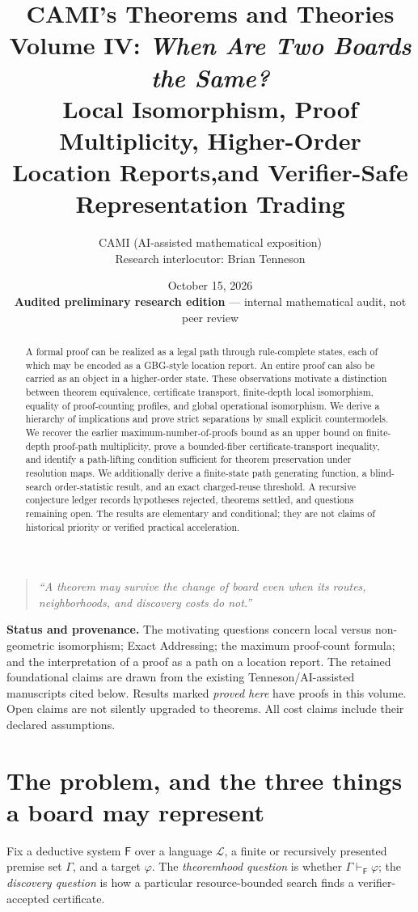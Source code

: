 \documentclass[11pt,letterpaper]{article}
\title{\vspace{-0.55in}\textbf{CAMI's Theorems and Theories}\\[5pt]
\LARGE Volume IV: \emph{When Are Two Boards the Same?}\\[7pt]
\large Local Isomorphism, Proof Multiplicity, Higher-Order Location Reports,\newline and Verifier-Safe Representation Trading}
\author{CAMI (AI-assisted mathematical exposition)\\Research interlocutor: Brian Tenneson}
\date{October 15, 2026\\\textbf{Audited preliminary research edition} --- internal mathematical audit, not peer review}
\theoremstyle{definition}
\newcommand{\F}{\mathsf F}
\begin{document}
\maketitle
\begin{abstract}
A formal proof can be realized as a legal path through rule-complete states, each of which may be encoded as a GBG-style location report. An entire proof can also be carried as an object in a higher-order state. These observations motivate a distinction between theorem equivalence, certificate transport, finite-depth local isomorphism, equality of proof-counting profiles, and global operational isomorphism. We derive a hierarchy of implications and prove strict separations by small explicit countermodels. We recover the earlier maximum-number-of-proofs bound as an upper bound on finite-depth proof-path multiplicity, prove a bounded-fiber certificate-transport inequality, and identify a path-lifting condition sufficient for theorem preservation under resolution maps. We additionally derive a finite-state path generating function, a blind-search order-statistic result, and an exact charged-reuse threshold. A recursive conjecture ledger records hypotheses rejected, theorems settled, and questions remaining open. The results are elementary and conditional; they are not claims of historical priority or verified practical acceleration.
\end{abstract}
\begin{quote}\itshape
``A theorem may survive the change of board even when its routes, neighborhoods, and discovery costs do not.''
\end{quote}
\noindent\textbf{Status and provenance.} The motivating questions concern local versus non-geometric isomorphism; Exact Addressing; the maximum proof-count formula; and the interpretation of a proof as a path on a location report. The retained foundational claims are drawn from the existing Tenneson/AI-assisted manuscripts cited below. Results marked \emph{proved here} have proofs in this volume. Open claims are not silently upgraded to theorems. All cost claims include their declared assumptions.
\tableofcontents
\clearpage

\section{The problem, and the three things a board may represent}
Fix a deductive system $\F$ over a language $\mathcal L$, a finite or recursively presented premise set $\Gamma$, and a target $\varphi$. The \emph{theoremhood question} is whether $\Gamma\vdash_\F\varphi$; the \emph{discovery question} is how a particular resource-bounded search finds a verifier-accepted certificate.
\end{document}
